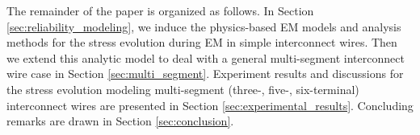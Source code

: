 The remainder of the paper is organized as follows. In Section
\ref{sec:reliability_modeling}, we induce the physics-based EM models
and analysis methods for the stress evolution during EM in simple
interconnect wires. Then we extend this analytic model to deal with a
general multi-segment interconnect wire case in Section
\ref{sec:multi_segment}. Experiment results and discussions for the
stress evolution modeling multi-segment (three-, five-, six-terminal)
interconnect wires are presented in Section
\ref{sec:experimental_results}. Concluding remarks are drawn in
Section \ref{sec:conclusion}.



